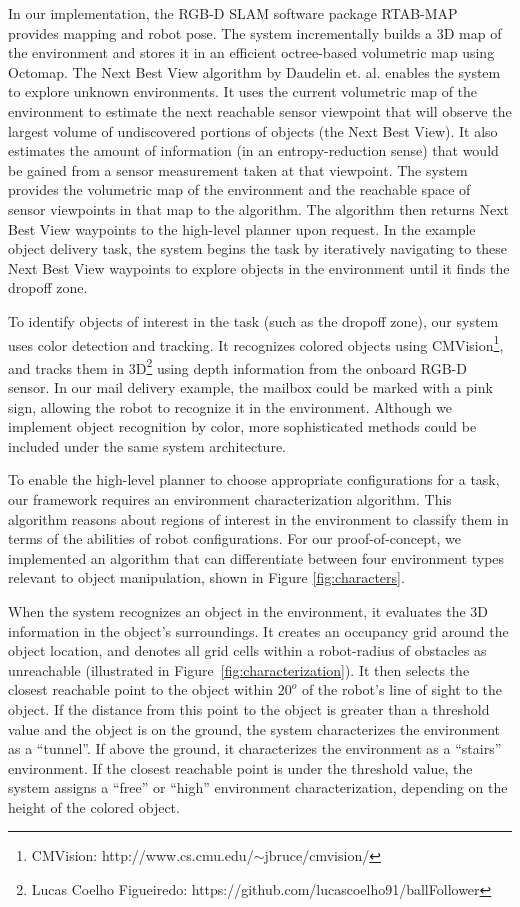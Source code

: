 \documentclass[journal]{IEEEtran}
\begin{document}
In our implementation, the RGB-D SLAM software package RTAB-MAP\cite{rtabmap} provides mapping and robot pose. The system incrementally builds a 3D map of the environment and stores it in an efficient octree-based volumetric map using Octomap\cite{octomap}. The Next Best View algorithm by Daudelin et. al.\cite{Daudelin2017} enables the system to explore unknown environments. It uses the current volumetric map of the environment to estimate the next reachable sensor viewpoint that will observe the largest volume of undiscovered portions of objects (the Next Best View). It also estimates the amount of information (in an entropy-reduction sense) that would be gained from a sensor measurement taken at that viewpoint. The system provides the volumetric map of the environment and the reachable space of sensor viewpoints in that map to the algorithm. The algorithm then returns Next Best View waypoints to the high-level planner upon request. In the example object delivery task, the system begins the task by iteratively navigating to these Next Best View waypoints to explore objects in the environment until it finds the dropoff zone.

To identify objects of interest in the task (such as the dropoff zone), our system uses color detection and tracking.  It recognizes colored objects using CMVision\footnote{CMVision: http://www.cs.cmu.edu/$\sim$jbruce/cmvision/}, and tracks them in 3D\footnote{Lucas Coelho Figueiredo: https://github.com/lucascoelho91/ballFollower} using depth information from the onboard RGB-D sensor. In our mail delivery example, the mailbox could be marked with a pink sign, allowing the robot to recognize it in the environment. Although we implement object recognition by color, more sophisticated methods could be included under the same system architecture.

To enable the high-level planner to choose appropriate configurations for a task, our framework requires an environment characterization algorithm. This algorithm reasons about regions of interest in the environment to classify them in terms of the abilities of robot configurations. For our proof-of-concept, we implemented an algorithm that can differentiate between four environment types relevant to object manipulation, shown in Figure \ref{fig:characters}. 

When the system recognizes an object in the environment, it evaluates the 3D information in the object's surroundings. It creates an occupancy grid around the object location, and denotes all grid cells within a robot-radius of obstacles as unreachable (illustrated in Figure~\ref{fig:characterization}). It then selects the closest reachable point to the object within $20^o$ of the robot's line of sight to the object. If the distance from this point to the object is greater than a threshold value and the object is on the ground, the system characterizes the environment as a ``tunnel''. If above the ground, it characterizes the environment as a ``stairs'' environment. If the closest reachable point is under the threshold value, the system assigns a ``free'' or ``high'' environment characterization, depending on the height of the colored object.
\end{document}
